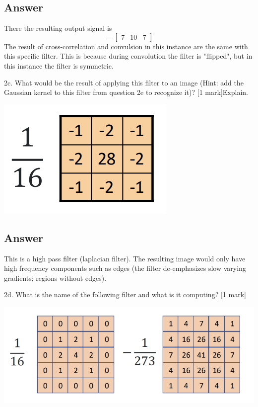 \documentclass[
	12pt, %
]{fphw}
\begin{document}
\subsection*{Answer}
There the resulting output signal is 
\[
=
  \begin{bmatrix}
    7 & 10 & 7
  \end{bmatrix}
\]
The result of cross-correlation and convulsion in this instance are the same with this specific filter. This is because during convolution the filter is "flipped", but in this instance the filter is symmetric. 
\begin{problem}
2c. What would be the result of applying this filter to an image (Hint: add the Gaussian
kernel to this filter from question 2e to recognize it)? [1 mark]Explain.
\begin{center}
	\includegraphics[width=0.5\columnwidth, page=1]{2c.png}
\end{center}
\end{problem}
\subsection*{Answer}
This is a high pass filter (laplacian filter). The resulting image would only have high frequency components such as edges (the filter de-emphasizes slow varying gradients; regions without edges).
\begin{problem}
2d. What is the name of the following filter and what is it computing? [1 mark]
\begin{center}
	\includegraphics[width=0.5\columnwidth, page=1]{2d.png}
\end{center}
\end{problem}
\end{document}
